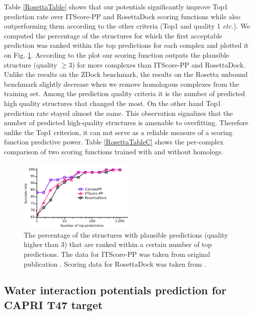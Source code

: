 \newpage


Table \ref{RosettaTable} shows that our potentials significantly improve Top1 prediction rate over ITScore-PP and RosettaDock scoring functions while also outperforming them according to the other criteria 
(Top1 and quality 1 \emph{etc.}). We computed the percentage of the structures for which the first acceptable prediction was ranked within the top predictions for each complex and plotted it on 
Fig. \ref{fig:ROC_ROSETTA}. According to the plot our scoring function outputs the plausible structure (quality $\geq$3) for more complexes than ITScore-PP and RosettaDock.
Unlike the results on the ZDock benchmark, the results on the Rosetta unbound benchmark slightly decrease when we remove 
homologous complexes from the training set. Among the prediction quality criteria it is the number of predicted
high quality structures that changed the most. On the other hand Top1 prediction rate stayed almost the same. This observation signalizes that the number of predicted high-quality structures is
amenable to overfitting. Therefore unlike the Top1 criterion, it can not serve as a reliable measure of a scoring function predictive power.
Table \ref{RosettaTableC} shows the per-complex comparison of two scoring functions trained with and without homologs.

\begin{figure}[H]
\begin{center}
\includegraphics[width=0.5\textwidth]{Scoring/Fig/RosettaU_ROC_Q123All}
\caption[the success rate on Rosetta benchmark]{The percentage of the structures with plausible predictions (quality higher than 3) that are ranked within a certain number of top predictions. 
The data for ITScore-PP was taken from original publication \cite{Huang2008}. Scoring data for RosettaDock was taken from \cite{RosettaDecoysLink}.}
\label{fig:ROC_ROSETTA} 
\end{center}
\end{figure}

\subsection{Water interaction potentials prediction for CAPRI T47 target}


